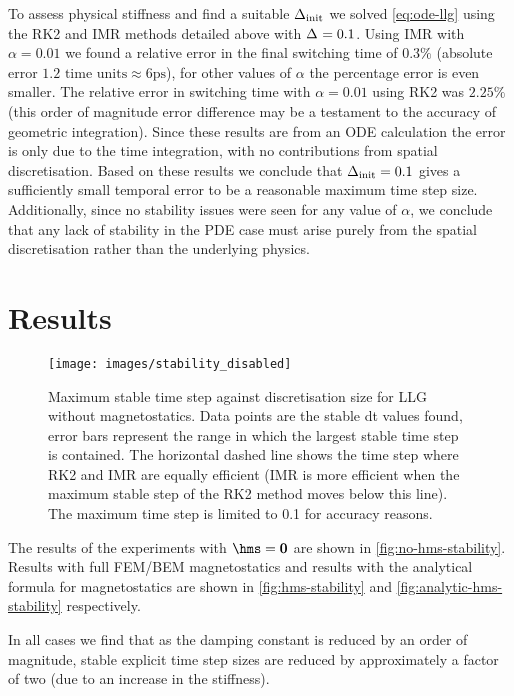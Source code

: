 \documentclass[10pt, final, conference, transmag]{IEEEtran}
\renewcommand{\figpos}{t!}
\newcommand{\figsize}{3.5in}
\begin{document}
To assess physical stiffness and find a suitable $\Delta_{\text{init}}$ we solved \eqref{eq:ode-llg} using the RK2 and IMR methods detailed above with $\Delta_{} = 0.1$.
Using IMR with $\alpha = 0.01$ we found a relative error in the final switching time of $0.3\%$ (absolute error  $1.2 \text{ time units} \approx 6\text{ps}$), for other values of $\alpha$ the percentage error is even smaller.
The relative error in switching time with $\alpha = 0.01$ using RK2 was $2.25\%$ (this order of magnitude error difference may be a testament to the accuracy of geometric integration\cite{dAquino2005}).
Since these results are from an ODE calculation the error is only due to the time integration, with no contributions from spatial discretisation.
Based on these results we conclude that $\Delta_{\text{init}} = 0.1$ gives a sufficiently small temporal error to be a reasonable maximum time step size.
Additionally, since no stability issues were seen for any value of $\alpha$, we conclude that any lack of stability in the PDE case must arise purely from the spatial discretisation rather than the underlying physics.



\section{Results}


\begin{figure}[\figpos]
  \centering
  \texttt{[image: images/stability\_disabled]}
  \caption{Maximum stable time step against discretisation size for LLG without magnetostatics. Data points are the stable dt values found, error bars represent the range in which the largest stable time step is contained. The horizontal dashed line shows the time step where RK2 and IMR are equally efficient (IMR is more efficient when the maximum stable step of the RK2 method moves below this line). The maximum time step is limited to 0.1 for accuracy reasons.}
  \label{fig:no-hms-stability}
\end{figure}


The results of the experiments with $\hms = \zerov$ are shown in \autoref{fig:no-hms-stability}.
Results with full FEM/BEM magnetostatics and results with the analytical formula for magnetostatics are shown in \autoref{fig:hms-stability} and \ref{fig:analytic-hms-stability} respectively. 

In all cases we find that as the damping constant is reduced by an order of magnitude, stable explicit time step sizes are reduced by approximately a factor of two (due to an increase in the stiffness).
\end{document}
